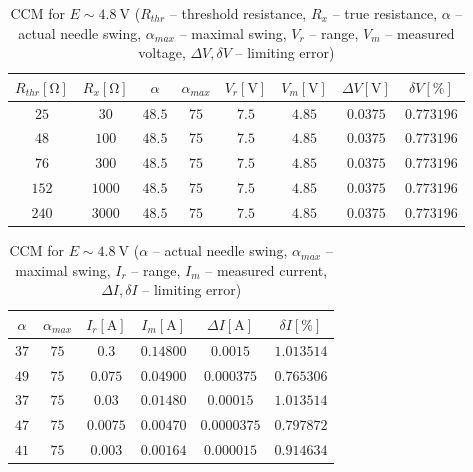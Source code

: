 \begin{table}[H]
	\centering
	\begin{tabular}{c| c | c | c | c | c | c | c}
		$R_{thr} [\unit{\ohm}]$& 	$R_x [\unit{\ohm}]$ &$\alpha$ & $\alpha_{max}$ & $V_r [\unit{\volt}]$ & $V_m [\unit{\volt}]$ & $\Delta V [\unit{\volt}]$ & $\delta V [\unit{\percent}]$ \\
		\hline
		$25$ & $30$ & $48.5$ & $75$ & $7.5$ & $4.85$ & $0.0375$ & $0.773196$ \\
		$48$ & $100$ & $48.5$ & $75$ & $7.5$ & $4.85$ & $0.0375$ & $0.773196$ \\
		$76$ & $300$ & $48.5$ & $75$ & $7.5$ & $4.85$ & $0.0375$ & $0.773196$ \\
		$152$ & $1000$ & $48.5$ & $75$ & $7.5$ & $4.85$ & $0.0375$ & $0.773196$ \\
		$240$ & $3000$ & $48.5$ & $75$ & $7.5$ & $4.85$ & $0.0375$ & $0.773196$ \\
	\end{tabular}
	\caption{CCM for $E\sim\SI{4.8}{\volt}$ ($R_{thr}$ -- threshold resistance, $R_x$ -- true resistance, $\alpha$ -- actual needle swing, $\alpha_{max}$ -- maximal swing, $V_r$ -- range, $V_m$ -- measured voltage, $\Delta V, \delta V$ -- limiting error)}
	\label{tab:analog-CCM1}
\end{table}

\begin{table}[H]
	\centering
	\begin{tabular}{  c | c | c | c | c | c}
		$\alpha$ & $\alpha_{max}$ & $I_r [\unit{\ampere}]$ & $I_m [\unit{\ampere}]$ & $\Delta I [\unit{\ampere}]$ & $\delta I [\unit{\percent}]$ \\
		\hline
		$37$ & $75$ & $0.3$ & $0.14800$ & $0.0015$ & $1.013514$ \\
		$49$ & $75$ & $0.075$ & $0.04900$ & $0.000375$ & $0.765306$ \\
		$37$ & $75$ & $0.03$ & $0.01480$ & $0.00015$ & $1.013514$ \\
		$47$ & $75$ & $0.0075$ & $0.00470$ & $0.0000375$ & $0.797872$ \\
		$41$ & $75$ & $0.003$ & $0.00164$ & $0.000015$ & $0.914634$ \\
	\end{tabular}
	\caption{CCM for $E\sim\SI{4.8}{\volt}$ ($\alpha$ -- actual needle swing, $\alpha_{max}$ -- maximal swing, $I_r$ -- range, $I_m$ -- measured current, $\Delta I, \delta I$ -- limiting error)}
	\label{tab:analog-CCM2}
\end{table}


